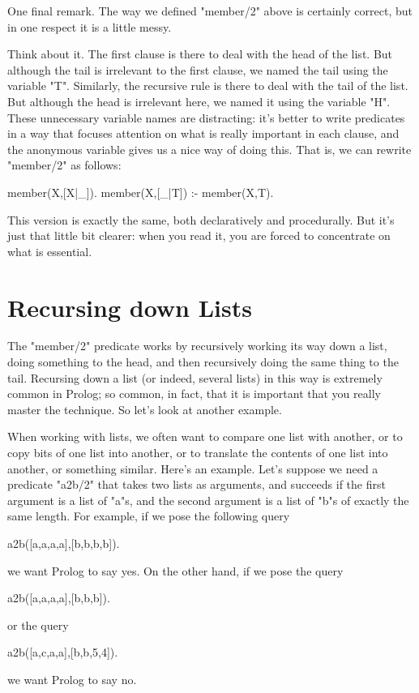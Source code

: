One final remark.  The way we defined "member/2" above is
certainly correct, but in one respect it is a little messy.

Think about it. The first clause is there to deal with the head of the
list. But although the tail is irrelevant to the first clause, we
named the tail using the variable "T". Similarly,
the recursive rule is there to deal with the tail of the list.  But
although the head is irrelevant here, we named it
using the variable  "H". These unnecessary variable
names are distracting: it's better to write predicates in a way that
focuses attention on what is really important in each clause, and the
anonymous variable gives us a nice way of doing this. That is, we  can rewrite
"member/2" as follows:
\begin{LPNcodedisplay}
member(X,[X|_]).
member(X,[_|T]) :- member(X,T).
\end{LPNcodedisplay}

This version is exactly the same, both declaratively and procedurally.
But it's just that little bit clearer: when you read it, you are
forced to concentrate on what is essential.


\section{Recursing down Lists}\label{SEC.L4.RDAL}

The "member/2" predicate works by recursively working its way down a
list, doing something to the head, and then recursively doing the same
thing to the tail. Recursing down a list (or indeed, several lists) in
this way is extremely common in Prolog; so common, in fact, that it is
important that you really master the technique. So let's look at another
example.

When working with lists, we often want to compare one list
with another, or to copy bits of one list into another, or to
translate the contents of one list into another, or something similar.
Here's an example. Let's suppose we need a predicate
"a2b/2" that takes two lists as arguments, and succeeds if
the first argument is a list of "a"s, and the second argument is
a list of "b"s of exactly the same length.  For example, if we
pose the following query
\begin{LPNcodedisplay}
a2b([a,a,a,a],[b,b,b,b]).
\end{LPNcodedisplay}
we want Prolog to say yes. On the other hand, if we pose the query
\begin{LPNcodedisplay}
a2b([a,a,a,a],[b,b,b]).
\end{LPNcodedisplay}
or the query
\begin{LPNcodedisplay}
a2b([a,c,a,a],[b,b,5,4]).
\end{LPNcodedisplay}
we want Prolog to say no.

